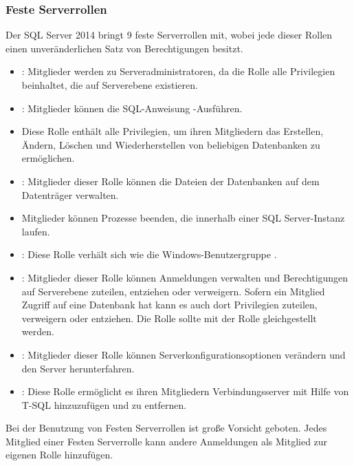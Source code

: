         \subsubsection{Feste Serverrollen}
          Der SQL Server 2014 bringt 9 feste Serverrollen mit, wobei jede dieser
          Rollen einen unveränderlichen Satz von Berechtigungen besitzt.
          \begin{itemize}
              \item {}: Mitglieder werden zu
              Serveradministratoren, da die Rolle alle Privilegien beinhaltet,
              die auf Serverebene existieren.
              \item {}: Mitglieder können die SQL-Anweisung
              -Ausführen.
              \item {} Diese Rolle enthält alle Privilegien,
              um ihren Mitgliedern das Erstellen, Ändern, Löschen und
              Wiederherstellen von beliebigen Datenbanken zu ermöglichen.
              \item {}: Mitglieder dieser Rolle können die
              Dateien der Datenbanken auf dem Datenträger verwalten.
              \item {} Mitglieder können Prozesse
              beenden, die innerhalb einer SQL Server-Instanz laufen.
              \item {}: Diese Rolle verhält sich wie die
              Windows-Benutzergruppe .
              \item {}: Mitglieder dieser Rolle können
              Anmeldungen verwalten und Berechtigungen auf Serverebene zuteilen,
              entziehen oder verweigern. Sofern ein Mitglied Zugriff auf eine
              Datenbank hat kann es auch dort Privilegien zuteilen, verweigern
              oder entziehen. Die Rolle  sollte mit
              der Rolle  gleichgestellt werden.
              \item {}: Mitglieder dieser Rolle können
              Serverkonfigurationsoptionen verändern und den Server
              herunterfahren.
              \item {}: Diese Rolle ermöglicht es ihren
              Mitgliedern Verbindungsserver mit Hilfe von T-SQL hinzuzufügen und
              zu entfernen.
          \end{itemize}
          \begin{merke}
            Bei der Benutzung von Festen Serverrollen ist große Vorsicht
            geboten. Jedes Mitglied einer Festen Serverrolle kann andere
            Anmeldungen als Mitglied zur eigenen Rolle hinzufügen.
          \end{merke}
          \begin{literaturinternet}
            \item \cite{ms188659}
            \item \cite{defsafdr2}
          \end{literaturinternet}
